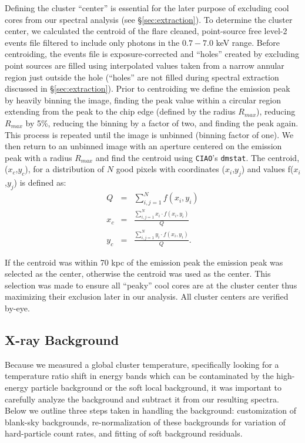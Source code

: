 \documentclass{emulateapj}
\begin{document}
Defining the cluster ``center'' is essential for the later purpose of
excluding cool cores from our spectral analysis (see
\S\ref{sec:extraction}). To determine the cluster center, we
calculated the centroid of the flare cleaned, point-source
free level-2 events file filtered to include only photons in the
$0.7-7.0$ keV range. Before centroiding, the events file is
exposure-corrected and ``holes'' created by excluding point sources
are filled using interpolated values taken from a narrow annular region just
outside the hole (``holes'' are not filled during spectral extraction
discussed in \S\ref{sec:extraction}). Prior to centroiding we define
the emission peak by heavily binning the image, finding the peak value
within a circular region extending from the peak to the chip edge
(defined by the radius $R_{max}$), reducing $R_{max}$ by 5\%,
reducing the binning by a factor of two, and finding the peak
again. This process is repeated until the image is unbinned (binning
factor of one). We then return to an unbinned image with an aperture
centered on the emission peak with a radius $R_{max}$ and find the
centroid using {\tt CIAO}'s {\tt dmstat}. The centroid, ($x_c$,$y_c$),
for a distribution of $N$ good pixels with coordinates ($x_i$,$y_j$)
and values f($x_i$,$y_j$) is defined as:
\begin{eqnarray}
Q &=& \sum_{i,j=1}^N f(x_i,y_i) \\
x_c &=& \frac{\sum_{i,j=1}^N x_i \cdot f(x_i,y_i)}{Q} \nonumber \\
y_c &=& \frac{\sum_{i,j=1}^N y_i \cdot f(x_i,y_i)}{Q}. \nonumber
\end{eqnarray}

If the centroid was within 70 kpc of the emission peak the emission
peak was selected as the center, otherwise the centroid was used
as the center. This selection was made to ensure all ``peaky'' cool
cores are at the cluster center thus maximizing their exclusion later
in our analysis. All cluster centers are verified by-eye.

\subsection{X-ray Background} \label{sec:background}

Because we measured a global cluster temperature, specifically looking
for a temperature ratio shift in energy bands which can be
contaminated by the high-energy particle background or the soft local
background, it was important to carefully analyze the background and
subtract it from our resulting spectra. Below we outline three steps
taken in handling the background: customization of blank-sky backgrounds,
re-normalization of these backgrounds for variation of hard-particle
count rates, and fitting of soft background residuals.
\end{document}
